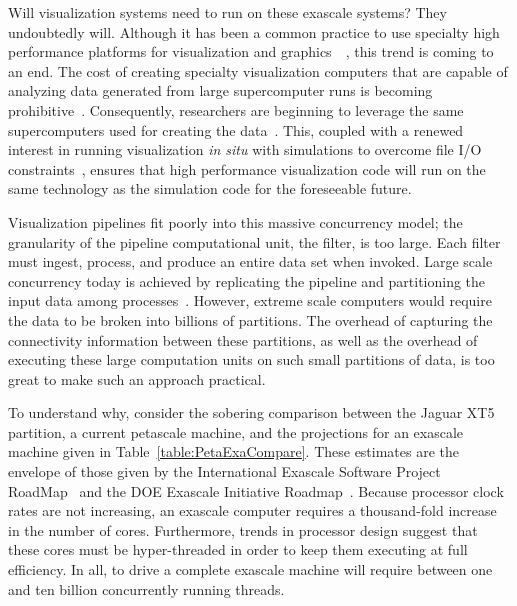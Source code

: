 \documentclass{vgtc}                          %
\newcommand*{\lcite}[1]{~\cite{#1}}
\begin{document}
Will visualization systems need to run on these exascale systems?  They
undoubtedly will.  Although it has been a common practice to use specialty
high performance platforms for visualization and graphics~\lcite{Wylie01},
this trend is coming to an end.  The cost of creating specialty
visualization computers that are capable of analyzing data generated from
large supercomputer runs is becoming prohibitive\lcite{Childs07}.
Consequently, researchers are beginning to leverage the same supercomputers
used for creating the data\lcite{Peterka09:SC,Peterka09:SciDAC,Yu08}.
This, coupled with a renewed interest in running visualization
\emph{in situ} with simulations to overcome file I/O
constraints\lcite{SNL092014,Tu06,Ross08,MaInSitu09,MaInSitu07},
ensures that high performance
visualization code will run on the same technology as the simulation code
for the foreseeable future.

Visualization pipelines fit poorly into this massive concurrency model; the
granularity of the pipeline computational unit, the filter, is too large.
Each filter must ingest, process, and produce an entire data set when
invoked.  Large scale concurrency today is achieved by replicating the
pipeline and partitioning the input data among processes\lcite{Ahrens00}.
However, extreme scale computers would require the data to be broken into
billions of partitions.  The overhead of capturing the connectivity
information between these partitions, as well as the overhead of executing
these large computation units on such small partitions of data, is too great
to make such an approach practical.

To understand why, consider the sobering comparison between the Jaguar XT5
partition, a current petascale machine, and the projections for an exascale
machine given in Table~\ref{table:PetaExaCompare}.  These estimates are the
envelope of those given by the International Exascale Software Project
RoadMap\lcite{ExascaleRoadMap} and the DOE Exascale Initiative
Roadmap\lcite{ASCACSummaryReport2010}.  Because processor clock rates are
not increasing, an exascale computer requires a thousand-fold increase in
the number of cores.  Furthermore, trends in processor design suggest that
these cores must be hyper-threaded in order to keep them executing at full
efficiency.  In all, to drive a complete exascale machine will require
between one and ten billion concurrently running threads.
\end{document}
